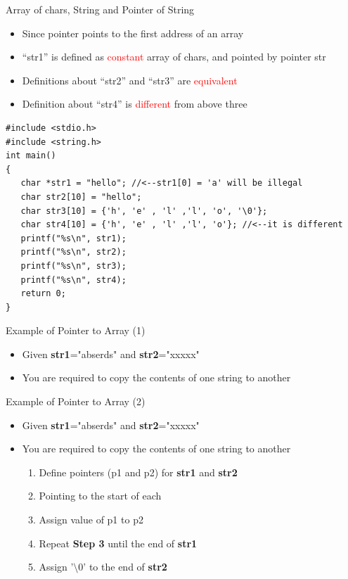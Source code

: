 \begin{frame}[fragile]{Array of chars, String and Pointer of String}
\vspace{-0.15in}
\begin{itemize}
	\item {Since pointer points to the first address of an array}
	\item {``str1'' is defined as \textcolor{red}{constant} array of chars, and pointed by pointer str}
	\item {Definitions about ``str2'' and ``str3'' are \textcolor{red}{equivalent}}
	\item {Definition about ``str4'' is \textcolor{red}{different} from above three}
\end{itemize}
\begin{lstlisting}[xleftmargin=0.02\linewidth, linewidth=0.98\linewidth]
#include <stdio.h>
#include <string.h>
int main()
{
   char *str1 = "hello"; //<--str1[0] = 'a' will be illegal
   char str2[10] = "hello";
   char str3[10] = {'h', 'e' , 'l' ,'l', 'o', '\0'};
   char str4[10] = {'h', 'e' , 'l' ,'l', 'o'}; //<--it is different
   printf("%s\n", str1);
   printf("%s\n", str2);
   printf("%s\n", str3);
   printf("%s\n", str4);
   return 0;
}
\end{lstlisting}
\end{frame}

\begin{frame}[fragile]{Example of Pointer to Array (1)}
\begin{itemize}
	\item {Given \textbf{str1}="abserds" and \textbf{str2}="xxxxx"}
	\item {You are required to copy the contents of one string to another}
\end{itemize}
\end{frame}

\begin{frame}[fragile]{Example of Pointer to Array (2)}
\begin{itemize}
	\item {Given \textbf{str1}="abserds" and \textbf{str2}="xxxxx"}
	\item {You are required to copy the contents of one string to another}
	\begin{enumerate}
		\item {Define pointers (p1 and p2) for \textbf{str1} and \textbf{str2}}
		\item {Pointing to the start of each}
		\item {Assign value of p1 to p2}
		\item {Repeat \textbf{Step 3} until the end of \textbf{str1}}
		\item {Assign '$\setminus0$' to the end of \textbf{str2}}
	\end{enumerate}
\end{itemize}
\end{frame}

